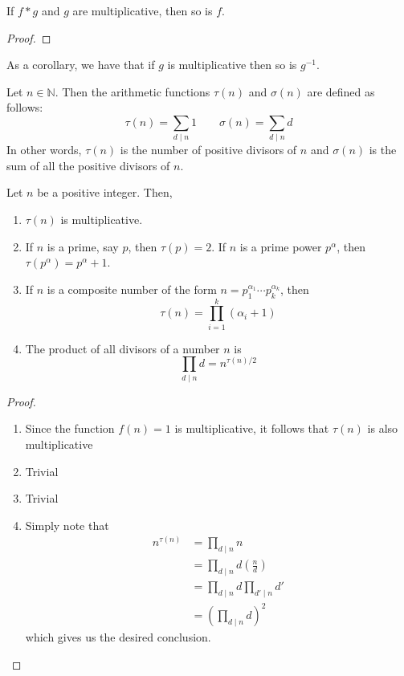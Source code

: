 \begin{theorem}
    If $f * g$ and $g$ are multiplicative, then so is $f$.
\end{theorem}
\begin{proof}
    
\end{proof}
As a corollary, we have that if $g$ is multiplicative then so is $g^{-1}$.

\begin{definition}
    Let $n\in\mathbb{N}$. Then the arithmetic functions $\tau(n)$ and $\sigma(n)$ are defined as follows:
    \begin{equation*}
        \tau(n) = \sum_{d\mid n}1 \qquad \sigma(n) = \sum_{d\mid n}d
    \end{equation*}
    In other words, $\tau(n)$ is the number of positive divisors of $n$ and $\sigma(n)$ is the sum of all the positive divisors of $n$.
\end{definition}

\begin{theorem}
    Let $n$ be a positive integer. Then, 
    \begin{enumerate}
        \item $\tau(n)$ is multiplicative.
        \item If $n$ is a prime, say $p$, then $\tau(p) = 2$. If $n$ is a prime power $p^\alpha$, then $\tau(p^\alpha) = p^\alpha + 1$.
        \item If $n$ is a composite number of the form $n = p_1^{\alpha_1}\cdots p_k^{\alpha_k}$, then
        \begin{equation*}
            \tau(n) = \prod_{i=1}^k(\alpha_i + 1)
        \end{equation*}
        \item The product of all divisors of a number $n$ is 
        \begin{equation*}
            \prod_{d\mid n}d = n^{\tau(n)/2}
        \end{equation*}
    \end{enumerate}
\end{theorem}
\begin{proof}
    \hfill 
    \begin{enumerate}
        \item Since the function $f(n) = 1$ is multiplicative, it follows that $\tau(n)$ is also multiplicative 
        \item Trivial 
        \item Trivial
        \item Simply note that 
        \begin{align*}
            n^{\tau(n)} &= \prod_{d\mid n}n\\
            &= \prod_{d\mid n}d\left(\frac{n}{d}\right)\\
            &= \prod_{d\mid n}d\prod_{d'\mid n}d'\\
            &= \left(\prod_{d\mid n}d\right)^2
        \end{align*}
        which gives us the desired conclusion.
    \end{enumerate}
\end{proof}

